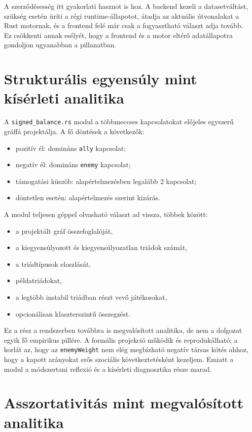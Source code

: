 ﻿\documentclass[a4paper,12pt]{report}
\begin{document}
A szerződésesség itt gyakorlati hasznot is hoz. A backend kezeli a datasetváltást, szükség esetén üríti a régi runtime-állapotot, átadja az aktuális útvonalakat a Rust motornak, és a frontend felé már csak a fogyasztható választ adja tovább. Ez csökkenti annak esélyét, hogy a frontend és a motor eltérő adatállapotra gondoljon ugyanabban a pillanatban.

\section{Strukturális egyensúly mint kísérleti analitika}

A \texttt{signed\_balance.rs} modul a többmeccses kapcsolatokat előjeles egyszerű gráffá projektálja. A fő döntések a következők:

\begin{itemize}
    \item pozitív él: domináns \texttt{ally} kapcsolat;
    \item negatív él: domináns \texttt{enemy} kapcsolat;
    \item támogatási küszöb: alapértelmezésben legalább 2 kapcsolat;
    \item döntetlen esetén: alapértelmezés szerint kizárás.
\end{itemize}

A modul teljesen géppel olvasható választ ad vissza, többek között:

\begin{itemize}
    \item a projektált gráf összefoglalóját,
    \item a kiegyensúlyozott és kiegyensúlyozatlan triádok számát,
    \item a triádtípusok eloszlását,
    \item példatriádokat,
    \item a legtöbb instabil triádban részt vevő játékosokat,
    \item opcionálisan klaszterszintű összegzést.
\end{itemize}

Ez a rész a rendszerben továbbra is megvalósított analitika, de nem a dolgozat egyik fő empirikus pillére. A formális projekció működik és reprodukálható; a korlát az, hogy az \texttt{enemyWeight} nem elég megbízható negatív társas kötés ahhoz, hogy a kapott arányokat erős szociális következtetésként kezeljem. Emiatt a modul a módszertani reflexió és a kísérleti diagnosztika része marad.

\section{Asszortativitás mint megvalósított analitika}
\end{document}
